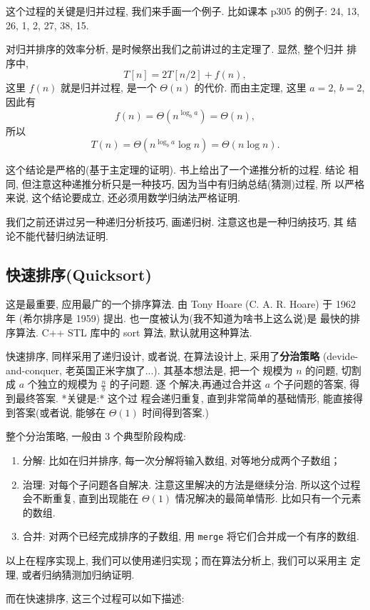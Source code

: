\documentclass[a4paper]{ctexart}
\theoremstyle{definition}
\theoremstyle{definition}
\begin{document}
这个过程的关键是归并过程, 我们来手画一个例子. 比如课本 p305 的例子:
24, 13, 26, 1, 2, 27, 38, 15.

对归并排序的效率分析, 是时候祭出我们之前讲过的主定理了. 显然, 整个归并
排序中,
$$
T[n] = 2 T[n / 2] + f(n),
$$
这里 $f(n)$ 就是归并过程, 是一个 $\Theta(n)$ 的代价. 而由主定理, 这里
$a = 2$, $b = 2$, 因此有
$$
f(n) = \Theta(n^{\log_ba}) = \Theta(n),
$$
所以
$$
T(n) = \Theta(n^{\log_ba}\log n) = \Theta(n \log n).
$$

这个结论是严格的(基于主定理的证明). 书上给出了一个递推分析的过程. 结论
相同, 但注意这种递推分析只是一种技巧, 因为当中有归纳总结(猜测)过程, 所
以严格来说, 这个结论要成立, 还必须用数学归纳法严格证明.

我们之前还讲过另一种递归分析技巧, 画递归树. 注意这也是一种归纳技巧, 其
结论不能代替归纳法证明.

\subsection{快速排序(Quicksort)}

这是最重要, 应用最广的一个排序算法. 由 Tony Hoare (C. A. R. Hoare) 于
1962 年 (希尔排序是 1959) 提出. 也一度被认为(我不知道为啥书上这么说)是
最快的排序算法. C++ STL 库中的 sort 算法, 默认就用这种算法.

快速排序, 同样采用了递归设计, 或者说, 在算法设计上, 采用了{\bf 分治策略}
(devide-and-conquer, 老英国正米字旗了...). 其基本想法是, 把一个
规模为 $n$ 的问题, 切割成 $a$ 个独立的规模为 $\frac{n}{b}$ 的子问题. 逐
个解决,再通过合并这 $a$ 个子问题的答案, 得到最终答案. *关键是:* 这个过
程会递归重复, 直到非常简单的基础情形, 能直接得到答案(或者说, 能够在
$\Theta(1)$ 时间得到答案.)

整个分治策略, 一般由 3 个典型阶段构成:

\begin{enumerate}
\item 分解: 比如在归并排序, 每一次分解将输入数组, 对等地分成两个子数组；
\item 治理: 对每个子问题各自解决. 注意这里解决的方法是继续分治.
  所以这个过程会不断重复, 直到出现能在 $\Theta(1)$ 情况解决的最简单情形.
  比如只有一个元素的数组. 
\item 合并: 对两个已经完成排序的子数组, 用 \verb|merge|
  将它们合并成一个有序的数组.
\end{enumerate}
   
以上在程序实现上, 我们可以使用递归实现；而在算法分析上, 我们可以采用主
定理, 或者归纳猜测加归纳证明.

而在快速排序, 这三个过程可以如下描述:
\end{document}
